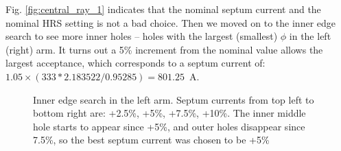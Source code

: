 Fig. \ref{fig:central_ray_1} indicates that the nominal septum current and the 
nominal HRS setting is not a bad choice.
Then we moved on to the inner edge search to see more inner holes -- holes 
with the largest (smallest) $\phi$ in the left (right) arm.
It turns out a 5\% increment from the nominal value allows the largest 
acceptance, which corresponds to a septum current of: $1.05 \times (333*2.183522/0.95285) = 801.25$~A.
\begin{figure}[!h]
    \caption[Inner edge search (left arm)]
    {Inner edge search in the left arm. Septum currents from top left
    to bottom right are: +2.5\%, +5\%, +7.5\%, +10\%. The inner middle hole starts
    to appear since +5\%, and outer holes disappear since 7.5\%, so the best
    septum current was chosen to be +5\%}
\end{figure}


